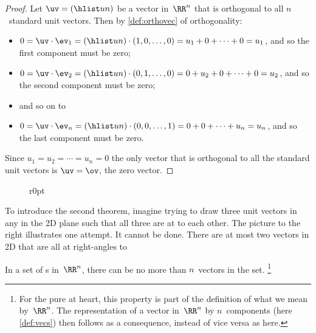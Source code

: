 \begin{proof} 
Let \(\uv=(\hlist un)\) be a vector in~\(\RR^n\) that is orthogonal to all \(n\)~standard unit vectors.  
Then by \cref{def:orthovec} of orthogonality:
\begin{itemize}
\item \(0=\uv\cdot\ev_1=(\hlist un)\cdot(1,0,\ldots,0)=u_1+0+\cdots+0=u_1\), and so the first component must be zero;
\item \(0=\uv\cdot\ev_2=(\hlist un)\cdot(0,1,\ldots,0)=0+u_2+0+\cdots+0=u_2\), and so the second component must be zero; 
\item and so on to
\item \(0=\uv\cdot\ev_n=(\hlist un)\cdot(0,0,\ldots,1)=0+0+\cdots+u_n=u_n\), and so the last component must be zero.
\end{itemize}
Since \(u_1=u_2=\cdots=u_n=0\) the only vector that is orthogonal to all the standard unit vectors is \(\uv=\ov\), the zero vector.
\end{proof}

\begin{wrapfigure}r{0pt}
\end{wrapfigure}
To introduce the second theorem, imagine trying to draw three unit vectors in any  in the 2D plane such that all three are at  to each other.
The picture to the right illustrates one attempt.
It cannot be done.
There are at most two vectors in 2D that are all at right-angles to 


\begin{theorem} \label{thm:orthcomp}
In a set of  s in~\(\RR^n\), there can be no more than \(n\)~vectors in the set.
\footnote{For the pure at heart, this property is part of the definition of what we mean by~\(\RR^n\).  
The representation of a vector in~\(\RR^n\) by \(n\)~components (here \cref{def:vecs}) then follows as a consequence, instead of vice versa as here.}
\end{theorem}

